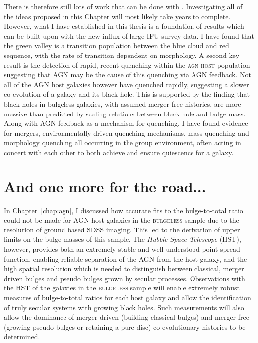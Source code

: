 There is therefore still lots of work that can be done with \starpy. Investigating all of the ideas proposed in this Chapter will most likely take years to complete. However, what I have established in this thesis is a foundation of results which can be built upon with the new influx of large IFU survey data. I have found that the green valley is a transition population between the blue cloud and red sequence, with the rate of transition dependent on morphology. A second key result is the detection of rapid, recent quenching within the \textsc{agn-host} population suggesting that AGN may be the cause of this quenching via AGN feedback. Not all of the AGN host galaxies however have quenched rapidly, suggesting a slower co-evolution of a galaxy and its black hole. This is supported by the finding that black holes in bulgeless galaxies, with assumed merger free histories, are more massive than predicted by scaling relations between black hole and bulge mass. Along with AGN feedback as a mechanism for quenching, I have found evidence for mergers, environmentally driven quenching mechanisms, mass quenching and morphology quenching all occurring in the group environment, often acting in concert with each other to both achieve and ensure quiescence for a galaxy. 

\section{And one more for the road...}\label{sec:hst}

In Chapter~\ref{chap:agn}, I discussed how accurate fits to the bulge-to-total ratio could not be made for AGN host galaxies in the \textsc{bulgeless} sample due to the resolution of ground based SDSS imaging. This led to the derivation of upper limits on the bulge masses of this sample. The \emph{Hubble Space Telescope} (HST), however, provides both an extremely stable and well understood point spread function, enabling reliable separation of the AGN from the host galaxy, and the high spatial resolution which is needed to distinguish between classical, merger driven bulges and pseudo bulges grown by secular processes. Observations with the HST of the galaxies in the \textsc{bulgeless} sample will enable extremely robust measures of bulge-to-total ratios for each host galaxy and allow the identification of truly secular systems with growing black holes. Such measurements will also allow the dominance of merger driven (building classical bulges) and merger free (growing pseudo-bulges or retaining a pure disc) co-evolutionary histories to be determined. 

